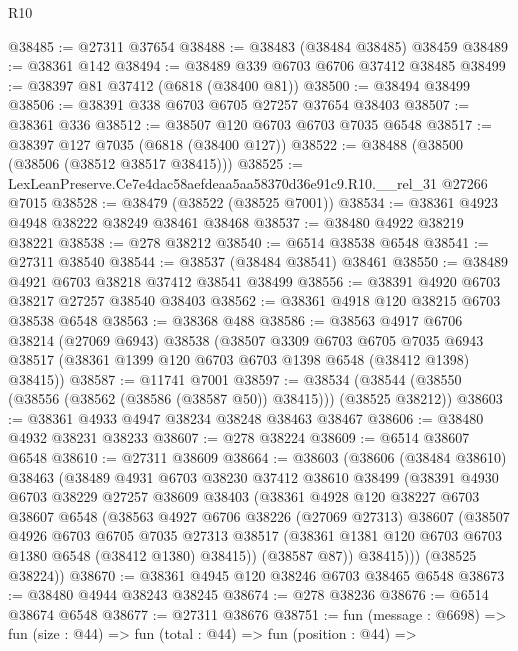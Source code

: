 \begin{lexlean}{R10}
\begin{coremodule}
@38485 := @27311 @37654
@38488 := @38483 (@38484 @38485) @38459
@38489 := @38361 @142
@38494 := @38489 @339 @6703 @6706 @37412 @38485
@38499 := @38397 @81 @37412 (@6818 (@38400 @81))
@38500 := @38494 @38499
@38506 := @38391 @338 @6703 @6705 @27257 @37654 @38403
@38507 := @38361 @336
@38512 := @38507 @120 @6703 @6703 @7035 @6548
@38517 := @38397 @127 @7035 (@6818 (@38400 @127))
@38522 := @38488 (@38500 (@38506 (@38512 @38517 @38415)))
@38525 := LexLeanPreserve.Ce7e4dac58aefdeaa5aa58370d36e91c9.R10.__rel_31 @27266 @7015
@38528 := @38479 (@38522 (@38525 @7001))
@38534 := @38361 @4923 @4948 @38222 @38249 @38461 @38468
@38537 := @38480 @4922 @38219 @38221
@38538 := @278 @38212
@38540 := @6514 @38538 @6548
@38541 := @27311 @38540
@38544 := @38537 (@38484 @38541) @38461
@38550 := @38489 @4921 @6703 @38218 @37412 @38541 @38499
@38556 := @38391 @4920 @6703 @38217 @27257 @38540 @38403
@38562 := @38361 @4918 @120 @38215 @6703 @38538 @6548
@38563 := @38368 @488
@38586 := @38563
    @4917
    @6706
    @38214
    (@27069 @6943)
    @38538
    (@38507
      @3309
      @6703
      @6705
      @7035
      @6943
      @38517
      (@38361 @1399 @120 @6703 @6703 @1398 @6548 (@38412 @1398) @38415))
@38587 := @11741 @7001
@38597 := @38534 (@38544 (@38550 (@38556 (@38562 (@38586 (@38587 @50)) @38415))) (@38525 @38212))
@38603 := @38361 @4933 @4947 @38234 @38248 @38463 @38467
@38606 := @38480 @4932 @38231 @38233
@38607 := @278 @38224
@38609 := @6514 @38607 @6548
@38610 := @27311 @38609
@38664 := @38603
    (@38606
      (@38484 @38610)
      @38463
      (@38489
        @4931
        @6703
        @38230
        @37412
        @38610
        @38499
        (@38391
          @4930
          @6703
          @38229
          @27257
          @38609
          @38403
          (@38361
            @4928
            @120
            @38227
            @6703
            @38607
            @6548
            (@38563
              @4927
              @6706
              @38226
              (@27069 @27313)
              @38607
              (@38507
                @4926
                @6703
                @6705
                @7035
                @27313
                @38517
                (@38361 @1381 @120 @6703 @6703 @1380 @6548 (@38412 @1380) @38415))
              (@38587 @87))
            @38415)))
      (@38525 @38224))
@38670 := @38361 @4945 @120 @38246 @6703 @38465 @6548
@38673 := @38480 @4944 @38243 @38245
@38674 := @278 @38236
@38676 := @6514 @38674 @6548
@38677 := @27311 @38676
@38751 := fun (message : @6698) =>
  fun (size : @44) =>
  fun (total : @44) =>
  fun (position : @44) =>

\end{coremodule}
\end{lexlean}
